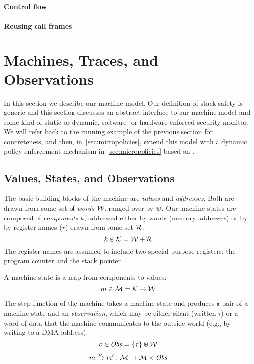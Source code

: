 \documentclass[acmsmall,review,anonymous]{acmart}\settopmatter{printfolios=true,printccs=false,printacmref=false}
\begin{document}
\paragraph*{Control flow}


\paragraph*{Reusing call frames}


\section{Machines, Traces, and Observations}
\label{sec:prelim}

In this section we describe our machine model. Our definition of stack
safety is generic and this section discusses an abstract interface to
our machine model and some kind of static or dynamic, software- or
hardware-enforced security monitor. We will refer back to the running
example of the previous section for concreteness, and then,
in~\cref{sec:micropolicies}, extend this model with a dynamic policy
enforcement mechanism in~\cref{sec:micropolicies} based on
.

\subsection{Values, States, and Observations}

The basic building blocks of the machine are {\em values} and {\em
  addresses}. Both are drawn from some set of {\em words}
${\mathcal W}$, ranged over by $w$.
%
Our machine states are composed of {\em components} $k$, addressed either by
words (memory addresses) or by by register names ($r$) drawn from some set
${\mathcal R}$.
%
    \[k \in {\mathcal K} = {\mathcal W} + {\mathcal R} \]
%
The register names are assumed to include two special purpose registers: the
program counter {\PCname} and the stack pointer \SP.

A machine state is a map from components to values:
%
\[m \in {\mathcal M} = {\mathcal K} \rightarrow {\mathcal W}\]

The step function of the machine takes a machine state and produces a
pair of a machine state and an {\em observation}, which may be either
silent (written $\tau$) or a word of data that the machine
communicates to the outside world (e.g., by writing to a DMA
address):
%
\[o \in \mathit{Obs} = \{\tau\} \uplus {\mathcal W}\]
\[m \xrightarrow{o} m' : {\mathcal M} \rightarrow {\mathcal M} \times \mathit{Obs} \]
%
\end{document}
